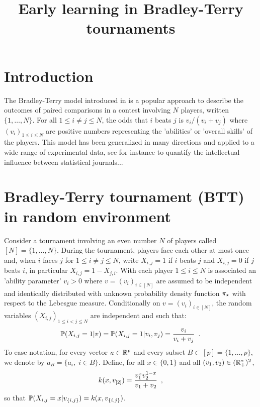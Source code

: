 


\title{Early learning in Bradley-Terry tournaments}
\date{}

\author{}

\lhead{}

\maketitle

\begin{abstract}

\end{abstract}

\section{Introduction}
The Bradley-Terry model introduced in \cite{bradley:terry:1952,zemerlo:1929} is a popular approach to describe the outcomes of paired comparisons in a contest involving $N$ players, written $\{1,\ldots,N\}$. For all $1\le i \ne j\le N$, the odds that $i$ beats $j$ is $v_i/(v_i+v_j)$ where $(v_i)_{1\le i\le N}$ are positive numbers representing the 'abilities' or 'overall skills' of  the players. This model has been generalized in many directions and applied to a wide range of experimental data, see for instance \cite{stigler:1994} to quantify the intellectual influence between statistical journals...
\cite{hastie:tibshirani:1998}
\cite{hunter:2004}
\section{Bradley-Terry tournament (BTT) in random environment}
Consider a tournament involving an even number $N$ of players called $[N]=\{1,\ldots,N\}$. 
During the tournament, players face each other at most once and, when $i$ faces $j$ for $1\le i \neq j\le N$, write $X_{i,j}=1$ if $i$ beats $j$ and $X_{i,j}=0$ if $j$ beats $i$, in particular $X_{i,j}=1-X_{j,i}$. With each player $1\le i\le N$ is associated an 'ability parameter' $v_i>0$ where $v=(v_i)_{i\in[N]}$ are assumed to be independent and identically distributed with unknown probability density function $\pi_{\star}$ with respect to the Lebesgue measure. Conditionally on $v=(v_i)_{i\in[N]}$, the random variables $(X_{i,j})_{1\le i<j\le N}$ are independent and such that:
\[
\mathbb{P}(X_{i,j}=1|v) = \mathbb{P}(X_{i,j}=1|v_i,v_j)=\frac{v_i}{v_i+v_j}\enspace.
\]
To ease notation, for every vector $a\in \mathbb{R}^p$ and every subset $B\subset [p]=\{1,\ldots,p\}$, we denote by $a_{B}=\{a_i,\;i\in B\}$. Define, for all $x\in \{0,1\}$ and all $(v_1,v_2)\in(\mathbb{R}_+^*)^2$, 
\begin{equation}
\label{eq:def:condlik}
k(x,v_{[2]})=\frac{v_1^xv_2^{1-x}}{v_1+v_2}\enspace,
\end{equation}
so that $\mathbb{P}(X_{i,j}=x|v_{\{i,j\}})=k(x,v_{\{i,j\}})$. 


